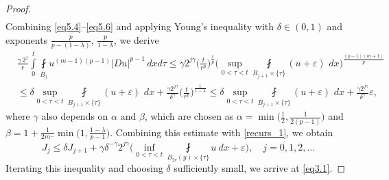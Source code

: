 \documentclass[10pt,a4paper]{amsart}
\begin{document}
\begin{proof}
\begin{equation}
\begin{aligned}
\end{aligned}
\end{equation}
Combining \eqref{eq5.4}--\eqref{eq5.6} and applying Young's inequality with $\delta \in (0,1)$ and exponents  $\frac{p}{p-(1-\lambda)}$, $\frac{p}{1-\lambda}$, we derive 
\begin{align*}
&\frac{\gamma\,2^j}{r}\int\limits_0^{t}\fint\limits_{\bar B_{j}}u^{(m-1)(p-1)}|D u|^{p-1}\,dx d\tau
\leqslant \gamma 2^{j \gamma} \Big(\frac{t}{r^{p}}\Big)^{\frac{1}{p}}\Big(\sup\limits_{0<\tau<t}\fint\limits_{B_{j+1}\times\{\tau\}}(u+\varepsilon) \,\,dx\Big)^{\frac{(p-1)(m+1)}{p}}\\
&\leqslant
\delta \sup\limits_{0<\tau<t}\fint\limits_{B_{j+1}\times\{\tau\}}(u+\varepsilon)\,\, dx+\frac{\gamma 2^{j\gamma}}{\delta^{\gamma}}\Big(\frac{t}{r^{p}}\Big)^{\frac{1}{1-\lambda}}\leqslant \delta \sup\limits_{0<\tau<t}\fint\limits_{B_{j+1}\times\{\tau\}}(u+\varepsilon)\,\, dx+\frac{\gamma 2^{j\gamma}}{\delta^{\gamma} } \varepsilon,
\end{align*}
where $\gamma$ also depends on $\alpha$ and $\beta$, which are chosen as $\alpha=\min\Big(\frac{1}{2}, \frac{1}{2(p-1)}\Big)$ and $\beta=1+\frac{1}{2m^{-}} \min\big(1, \frac{1-\lambda}{p-1}\big)$.
Combining this estimate with \eqref{recurs_1}, we obtain
\begin{equation*}
J_{j} \leqslant \delta J_{j+1} + \gamma \delta^{-\gamma} 2^{j \gamma}\big(\inf\limits_{0< \tau <t} \fint\limits_{B_{2r}(y)\times\{\tau\}} u\ dx
+ \varepsilon\big), \quad j=0, 1, 2,\ldots
\end{equation*}
Iterating this inequality and choosing $\delta$ sufficiently small, we arrive at \eqref{eq3.1}.
\end{proof}
\end{document}
